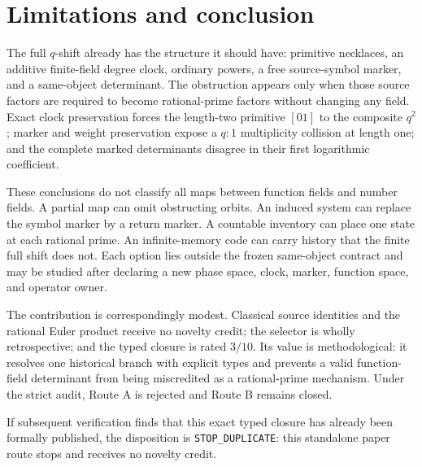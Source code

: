 \section{Limitations and conclusion}
\label{sec:conclusion}

The full $q$-shift already has the structure it should have: primitive
necklaces, an additive finite-field degree clock, ordinary powers, a free
source-symbol marker, and a same-object determinant. The obstruction appears
only when those source factors are required to become rational-prime factors
without changing any field. Exact clock preservation forces the length-two
primitive $[01]$ to the composite $q^2$; marker and weight preservation expose
a $q:1$ multiplicity collision at length one; and the complete marked
determinants disagree in their first logarithmic coefficient.

These conclusions do not classify all maps between function fields and number
fields. A partial map can omit obstructing orbits. An induced system can
replace the symbol marker by a return marker. A countable inventory can place
one state at each rational prime. An infinite-memory code can carry history
that the finite full shift does not. Each option lies outside the frozen
same-object contract and may be studied after declaring a new phase space,
clock, marker, function space, and operator owner.

The contribution is correspondingly modest. Classical source identities and
the rational Euler product receive no novelty credit; the selector is wholly
retrospective; and the typed closure is rated $3/10$. Its value is
methodological: it resolves one historical branch with explicit types and
prevents a valid function-field determinant from being miscredited as a
rational-prime mechanism. Under the strict audit, Route A is rejected and
Route B remains closed.

If subsequent verification finds that this exact typed closure has already
been formally published, the disposition is \texttt{STOP\_DUPLICATE}: this
standalone paper route stops and receives no novelty credit.
